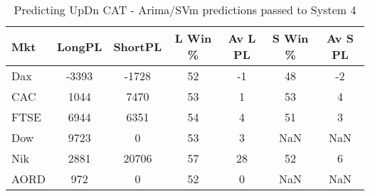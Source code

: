 \begin{table}[ht]
\centering
\caption[Predicting UpDn CAT - Arima/SVM predictions passed to System 4.]{Predicting UpDn CAT - Arima/SVm predictions passed to System 4} 
\label{tab:chp_ts:pUD_CAT_arima_svm_sys}
\begin{tabular}{lcccccc}
  \toprule Mkt & LongPL & ShortPL & L Win \% & Av L PL & S Win \% & Av S PL \\ 
  \midrule Dax & -3393 & -1728 & 52 & -1 & 48 & -2 \\ 
  CAC & 1044 & 7470 & 53 & 1 & 53 & 4 \\ 
  FTSE & 6944 & 6351 & 54 & 4 & 51 & 3 \\ 
  Dow & 9723 & 0 & 53 & 3 & NaN & NaN \\ 
  Nik & 2881 & 20706 & 57 & 28 & 52 & 6 \\ 
  AORD & 972 & 0 & 52 & 0 & NaN & NaN \\ 
   \bottomrule \end{tabular}
\end{table}
